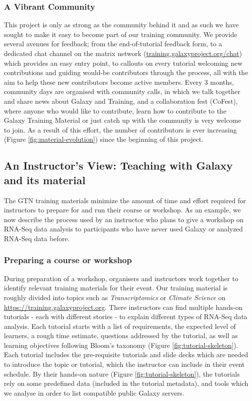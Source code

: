 \documentclass[10pt,letterpaper]{article}
\begin{document}
\subsubsection*{A Vibrant Community}
This project is only as strong as the community behind it and as such we have sought to make it easy to become part of our training community. We provide several avenues for feedback; from the end-of-tutorial feedback form, to a dedicated chat channel on the matrix network (\url{training.galaxyproject.org/chat}) which provides an easy entry point, to callouts on every tutorial welcoming new contributions and guiding would-be contributors through the process, all with the aim to help these new contributors become active members. Every 3 months, community days are organised with community calls, in which we talk together and share news about Galaxy and Training, and a collaboration fest (CoFest), where anyone who would like to contribute, learn how to contribute to the Galaxy Training Material or just catch up with the community is very welcome to join. As a result of this effort, the number of contributors is ever increasing (Figure \ref{fig:material-evolution}) since the beginning of this project.

\subsection*{An Instructor's View: Teaching with Galaxy and its material}

The GTN training materials minimize the amount of time and effort required for instructors to prepare for and run their course or workshop. As an example, we now describe the process used by an instructor who plans to give a workshop on RNA-Seq data analysis to participants who have never used Galaxy or analyzed RNA-Seq data before.

\subsubsection*{Preparing a course or workshop}
During preparation of a workshop, organisers and instructors work together to identify relevant training materials for their event. Our training material is roughly divided into topics such as \emph{Transcriptomics} or \emph{Climate Science} on \url{https://training.galaxyproject.org}. There instructors can find multiple hands-on tutorials - each with different stories - to explain different types of RNA-Seq data analysis. Each tutorial starts with a list of requirements, the expected level of learners, a rough time estimate, questions addressed by the tutorial, as well as learning objectives following Bloom’s taxonomy \cite{Bloom1956} (Figure \ref{fig:tutorial-skeleton}). Each tutorial includes the pre-requisite tutorials and slide decks which are needed to introduce the topic or tutorial, which the instructor can include in their event schedule. By their hands-on nature (Figure \ref{fig:tutorial-skeleton}), the tutorials rely on some predefined data (included in the tutorial metadata), and tools which we analyse in order to list compatible public Galaxy servers.
\end{document}
